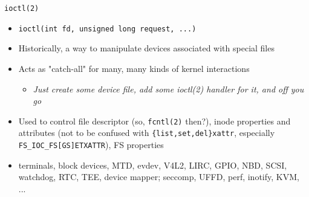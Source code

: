 \documentclass[unicode,aspectratio=169]{beamer}
\begin{document}
\begin{frame}{\texttt{ioctl(2)}}
\begin{itemize}
  \item \texttt{ioctl(int fd, unsigned long request, ...)}
  \item Historically, a way to manipulate devices associated with special files
  \item Acts as "catch-all" for many, many kinds of kernel interactions
  \begin{itemize}
    \item \emph{Just create some device file, add some ioctl(2) handler for it, and off you go}
  \end{itemize}
  \item Used to control file descriptor (so, \texttt{fcntl(2)} then?),
        inode properties and attributes (not to be confused
        with \texttt{\{list,set,del\}xattr}, especially
	\texttt{FS\_IOC\_FS[GS]ETXATTR}), FS properties
  \item terminals, block devices, MTD, evdev, V4L2, LIRC, GPIO, NBD, SCSI,
        watchdog, RTC, TEE, device mapper;  seccomp, UFFD, perf, inotify, KVM,
	...
\end{itemize}
\end{frame}
\end{document}
